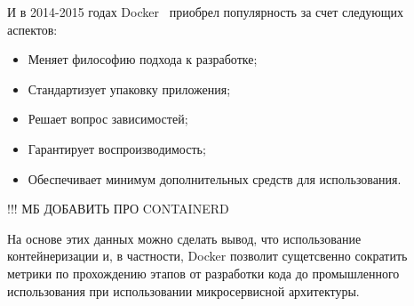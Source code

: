 \begin{enumerate}
        И в 2014-2015 годах Docker~\cite{демидова2019использование} приобрел популярность за счет следующих аспектов:
        \begin{itemize}
            \item Меняет философию подхода к разработке;
            \item Стандартизует упаковку приложения;
            \item Решает вопрос зависимостей;
            \item Гарантирует воспроизводимость;
            \item Обеспечивает минимум дополнительных средств для использования.
        \end{itemize}

        !!! МБ ДОБАВИТЬ ПРО CONTAINERD

\end{enumerate}

На основе этих данных можно сделать вывод, что использование контейнеризации и, в частности, Docker позволит сущетсвенно сократить метрики по прохождению этапов от разработки кода до промышленного использования при использовании микросервисной архитектуры.
